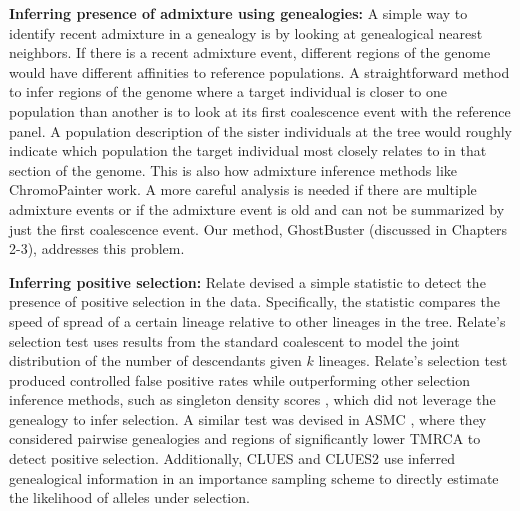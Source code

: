 \textbf{Inferring presence of admixture using genealogies:} A simple way to identify recent admixture in a genealogy is by looking at genealogical nearest neighbors. If there is a recent admixture event, different regions of the genome would have different affinities to reference populations. A straightforward method to infer regions of the genome where a target individual is closer to one population than another is to look at its first coalescence event with the reference panel. A population description of the sister individuals at the tree would roughly indicate which population the target individual most closely relates to in that section of the genome. This is also how admixture inference methods like ChromoPainter work. A more careful analysis is needed if there are multiple admixture events or if the admixture event is old and can not be summarized by just the first coalescence event. Our method, GhostBuster (discussed in Chapters 2-3), addresses this problem. 

\textbf{Inferring positive selection:} Relate \cite{speidel2024high} devised a simple statistic to detect the presence of positive selection in the data. Specifically, the statistic compares the speed of spread of a certain lineage relative to other lineages in the tree. Relate's selection test uses results from the standard coalescent to model the joint distribution of the number of descendants given \(k\) lineages. Relate's selection test produced controlled false positive rates while outperforming other selection inference methods, such as singleton density scores \cite{field2016detection}, which did not leverage the genealogy to infer selection. A similar test was devised in ASMC \cite{palamara2018high}, where they considered pairwise genealogies and regions of significantly lower TMRCA to detect positive selection. Additionally, CLUES \cite{stern2019approximate} and CLUES2 \cite{vaughn2024fast} use inferred genealogical information in an importance sampling scheme to directly estimate the likelihood of alleles under selection.

